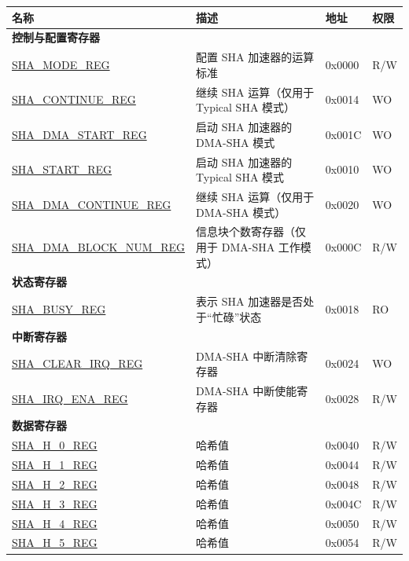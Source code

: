 \begin{longtable}{ | l| p{7.5cm} | p{1.3cm} | p{1cm} | }
\hline\rowcolor{lightgray}
\textbf{名称} & \textbf{描述} &\textbf{地址} & \textbf{权限} \\ \hline
\endhead
\multicolumn{4}{|l|}{\textbf{控制与配置寄存器}} \\ \hline
\hyperref[regdesc:SHAMODEREG]{SHA\_MODE\_REG} & 配置 SHA 加速器的运算标准 & 0x0000 & R/W \\\hline
\hyperref[regdesc:SHACONTINUEREG]{SHA\_CONTINUE\_REG} & 继续 SHA 运算（仅用于 Typical SHA 模式） & 0x0014 & WO \\ \hline
\hyperref[regdesc:SHADMASTARTREG]{SHA\_DMA\_START\_REG} & 启动 SHA  加速器的 DMA-SHA 模式 & 0x001C & WO \\ \hline
\hyperref[regdesc:SHASTARTREG]{SHA\_START\_REG} & 启动 SHA 加速器的 Typical SHA 模式 & 0x0010 & WO \\ \hline
\hyperref[regdesc:SHADMACONTINUEREG]{SHA\_DMA\_CONTINUE\_REG} & 继续 SHA 运算（仅用于 DMA-SHA 模式） & 0x0020 & WO \\ \hline
\hyperref[regdesc:SHADMABLOCKNUMREG]{SHA\_DMA\_BLOCK\_NUM\_REG} & 信息块个数寄存器（仅用于 DMA-SHA 工作模式） & 0x000C & R/W \\ \hline
\multicolumn{4}{|l|}{\textbf{状态寄存器}} \\ \hline
\hyperref[regdesc:SHABUSYREG]{SHA\_BUSY\_REG} & 表示 SHA 加速器是否处于“忙碌”状态 & 0x0018 & RO \\ \hline
\multicolumn{4}{|l|}{\textbf{中断寄存器}} \\ \hline
\hyperref[regdesc:SHACLEARIRQREG]{SHA\_CLEAR\_IRQ\_REG} & DMA-SHA 中断清除寄存器 & 0x0024 & WO \\ \hline
\hyperref[regdesc:SHAIRQENAREG]{SHA\_IRQ\_ENA\_REG} & DMA-SHA 中断使能寄存器 & 0x0028 & R/W \\ \hline
\multicolumn{4}{|l|}{\textbf{数据寄存器}} \\ \hline
\hyperref[regdesc:SHAHNREG]{SHA\_H\_0\_REG} & 哈希值 & 0x0040 & R/W \\ \hline
\hyperref[regdesc:SHAHNREG]{SHA\_H\_1\_REG} & 哈希值 & 0x0044 & R/W \\ \hline
\hyperref[regdesc:SHAHNREG]{SHA\_H\_2\_REG} & 哈希值 & 0x0048 & R/W \\ \hline
\hyperref[regdesc:SHAHNREG]{SHA\_H\_3\_REG} & 哈希值 & 0x004C & R/W \\ \hline
\hyperref[regdesc:SHAHNREG]{SHA\_H\_4\_REG} & 哈希值 & 0x0050 & R/W \\ \hline
\hyperref[regdesc:SHAHNREG]{SHA\_H\_5\_REG} & 哈希值 & 0x0054 & R/W \\ \hline

\end{longtable}

